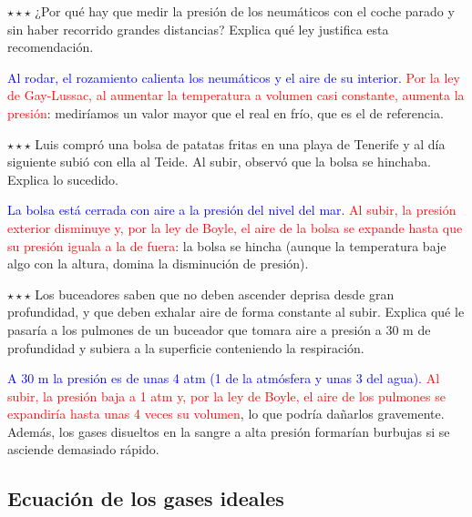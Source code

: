 \begin{exercise}
    \(\star\star\star\) ¿Por qué hay que medir la presión de los neumáticos con el coche parado y sin haber recorrido grandes distancias?
    Explica qué ley justifica esta recomendación.
    \begin{solu}
        \textcolor{blue}{Al rodar, el rozamiento calienta los neumáticos y el aire de su interior.} \textcolor{red}{Por la ley de Gay-Lussac, al
        aumentar la temperatura a volumen casi constante, aumenta la presión}: mediríamos un valor mayor que el real en frío, que es el
        de referencia.
    \end{solu}
\end{exercise}

\begin{exercise}
    \(\star\star\star\) Luis compró una bolsa de patatas fritas en una playa de Tenerife y al día siguiente subió con ella al Teide. Al
    subir, observó que la bolsa se hinchaba. Explica lo sucedido.
    \begin{solu}
        \textcolor{blue}{La bolsa está cerrada con aire a la presión del nivel del mar.} \textcolor{red}{Al subir, la presión exterior disminuye
        y, por la ley de Boyle, el aire de la bolsa se expande hasta que su presión iguala a la de fuera}: la bolsa se hincha (aunque la
        temperatura baje algo con la altura, domina la disminución de presión).
    \end{solu}
\end{exercise}

\begin{exercise}
    \(\star\star\star\) Los buceadores saben que no deben ascender deprisa desde gran profundidad, y que deben exhalar aire de forma
    constante al subir. Explica qué le pasaría a los pulmones de un buceador que tomara aire a presión a 30 m de profundidad y
    subiera a la superficie conteniendo la respiración.
    \begin{solu}
        \textcolor{blue}{A 30 m la presión es de unas 4 atm (1 de la atmósfera y unas 3 del agua).} \textcolor{red}{Al subir, la presión baja
        a 1 atm y, por la ley de Boyle, el aire de los pulmones se expandiría hasta unas 4 veces su volumen}, lo que podría dañarlos
        gravemente. Además, los gases disueltos en la sangre a alta presión formarían burbujas si se asciende demasiado rápido.
    \end{solu}
\end{exercise}

\subsection{Ecuación de los gases ideales}

